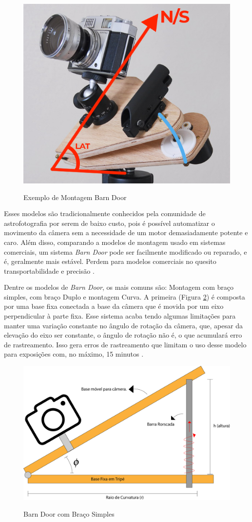 \begin{figure}[!htb]
	\centering
	\caption{Exemplo de Montagem Barn Door}
	\includegraphics[width=0.5\linewidth]{figuras/barndoorexample}
	\label{fig:barndoorexample}
\end{figure}


Esses modelos são tradicionalmente conhecidos pela comunidade de astrofotografia por serem de baixo custo, pois é possível automatizar o movimento da câmera sem a necessidade de um motor demasiadamente potente e caro. Além disso, comparando a modelos de montagem usado em sistemas comerciais, um sistema \textit{Barn Door} pode ser facilmente modificado ou reparado, e é, geralmente mais estável. Perdem para modelos comerciais no quesito transportabilidade e precisão \cite{site:pentaxBarnDoor}. 
 
Dentre os modelos de \textit{Barn Door}, os mais comuns são: Montagem com braço simples, com braço Duplo e montagem Curva. A primeira (Figura \ref{fig:singleArm}) é composta por uma base fixa conectada a base da câmera que é movida por um eixo perpendicular à parte fixa. Esse sistema acaba tendo algumas limitações para manter uma variação constante no ângulo de rotação da câmera, que, apesar da elevação do eixo ser constante, o ângulo de rotação não é, o que acumulará erro de rastreamento. Isso gera erros de rastreamento que limitam o uso desse modelo para exposições com, no máximo, 15 minutos \cite{artigo:davidtrottinventions}. 

\begin{figure}[!htb]
	\centering
	\caption{Barn Door com Braço Simples}
	\includegraphics[width=0.6\linewidth]{figuras/bracosimples}
	\label{fig:singleArm}
\end{figure}


